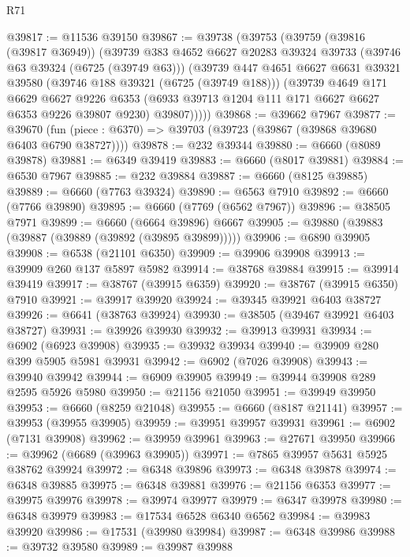\begin{lexlean}{R71}
\begin{coremodule}
@39817 := @11536 @39150
@39867 := @39738
    (@39753
      (@39759
        (@39816 (@39817 @36949))
        (@39739
          @383
          @4652
          @6627
          @20283
          @39324
          @39733
          (@39746 @63 @39324 (@6725 (@39749 @63)))
          (@39739
            @447
            @4651
            @6627
            @6631
            @39321
            @39580
            (@39746 @188 @39321 (@6725 (@39749 @188)))
            (@39739
              @4649
              @171
              @6629
              @6627
              @9226
              @6353
              (@6933 @39713 @1204 @111 @171 @6627 @6627 @6353 @9226 @39807 @9230)
              @39807)))))
@39868 := @39662 @7967
@39877 := @39670
    (fun (piece : @6370) => @39703 (@39723 (@39867 (@39868 @39680 @6403 @6790 @38727))))
@39878 := @232 @39344
@39880 := @6660 (@8089 @39878)
@39881 := @6349 @39419
@39883 := @6660 (@8017 @39881)
@39884 := @6530 @7967
@39885 := @232 @39884
@39887 := @6660 (@8125 @39885)
@39889 := @6660 (@7763 @39324)
@39890 := @6563 @7910
@39892 := @6660 (@7766 @39890)
@39895 := @6660 (@7769 (@6562 @7967))
@39896 := @38505 @7971
@39899 := @6660 (@6664 @39896) @6667
@39905 := @39880 (@39883 (@39887 (@39889 (@39892 (@39895 @39899)))))
@39906 := @6890 @39905
@39908 := @6538 (@21101 @6350)
@39909 := @39906 @39908
@39913 := @39909 @260 @137 @5897 @5982
@39914 := @38768 @39884
@39915 := @39914 @39419
@39917 := @38767 (@39915 @6359)
@39920 := @38767 (@39915 @6350) @7910
@39921 := @39917 @39920
@39924 := @39345 @39921 @6403 @38727
@39926 := @6641 (@38763 @39924)
@39930 := @38505 (@39467 @39921 @6403 @38727)
@39931 := @39926 @39930
@39932 := @39913 @39931
@39934 := @6902 (@6923 @39908)
@39935 := @39932 @39934
@39940 := @39909 @280 @399 @5905 @5981 @39931
@39942 := @6902 (@7026 @39908)
@39943 := @39940 @39942
@39944 := @6909 @39905
@39949 := @39944 @39908 @289 @2595 @5926 @5980
@39950 := @21156 @21050
@39951 := @39949 @39950
@39953 := @6660 (@8259 @21048)
@39955 := @6660 (@8187 @21141)
@39957 := @39953 (@39955 @39905)
@39959 := @39951 @39957 @39931
@39961 := @6902 (@7131 @39908)
@39962 := @39959 @39961
@39963 := @27671 @39950
@39966 := @39962 (@6689 (@39963 @39905))
@39971 := @7865 @39957 @5631 @5925 @38762 @39924
@39972 := @6348 @39896
@39973 := @6348 @39878
@39974 := @6348 @39885
@39975 := @6348 @39881
@39976 := @21156 @6353
@39977 := @39975 @39976
@39978 := @39974 @39977
@39979 := @6347 @39978
@39980 := @6348 @39979
@39983 := @17534 @6528 @6340 @6562
@39984 := @39983 @39920
@39986 := @17531 (@39980 @39984)
@39987 := @6348 @39986
@39988 := @39732 @39580
@39989 := @39987 @39988

\end{coremodule}
\end{lexlean}
